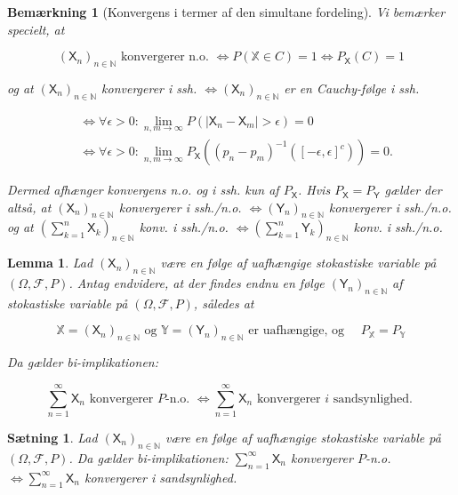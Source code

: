 \documentclass{article}
\newcommand{\1}{\mathbbm{1}}
\newcommand{\X}{\mathsf{X}}
\newcommand{\Y}{\mathsf{Y}}
\theoremstyle{boxed}
\newtheorem{lemma}[theorem]{Lemma}
\newtheorem{remark}[theorem]{Bemærkning}
\newtheorem{proposition}[theorem]{Sætning}
\begin{document}
\begin{remark}[Konvergens i termer af den simultane fordeling] 
    Vi bemærker specielt, at

$$
\left(\X_n\right)_{n \in \mathbb{N}} \text { konvergerer n.o. } \Longleftrightarrow P(\mathbb{X} \in C)=1 \Longleftrightarrow P_{\X}(C)=1
$$

og at
$\left(\X_n\right)_{n \in \mathbb{N}}$ konvergerer i ssh. $\Longleftrightarrow\left(\X_n\right)_{n \in \mathbb{N}}$ er en Cauchy-følge i ssh.

$$
\begin{aligned}
& \Longleftrightarrow \forall \epsilon>0: \lim _{n, m \rightarrow \infty} P\left(\left|\X_n-\X_m\right|>\epsilon\right)=0 \\
& \Longleftrightarrow \forall \epsilon>0: \lim _{n, m \rightarrow \infty} P_{\X}\left(\left(p_n-p_m\right)^{-1}\left([-\epsilon, \epsilon]^c\right)\right)=0 .
\end{aligned}
$$


Dermed afhænger konvergens n.o. og i ssh. kun af $P_{\X}$.
Hvis $P_{\X}=P_{\Y}$ gælder der altså, at
$\left(\X_n\right)_{n \in \mathbb{N}}$ konvergerer i ssh./n.o. $\Longleftrightarrow\left(\Y_n\right)_{n \in \mathbb{N}}$ konvergerer i ssh./n.o.
og at
$\left(\sum_{k=1}^n \X_k\right)_{n \in \mathbb{N}}$ konv. i ssh./n.o. $\Longleftrightarrow\left(\sum_{k=1}^n \Y_k\right)_{n \in \mathbb{N}}$ konv. i ssh./n.o.
\end{remark}
\begin{theorem-box}
    \begin{lemma}
        Lad $\left(\mathsf{X}_n\right)_{n \in \mathbb{N}}$ være en følge af uafhængige stokastiske variable på $(\Omega, \mathcal{F}, P)$.
Antag endvidere, at der findes endnu en følge $\left(\mathsf{Y}_n\right)_{n \in \mathbb{N}}$ af stokastiske variable på $(\Omega, \mathcal{F}, P)$, således at

$$
\mathbb{X}=\left(\mathsf{X}_n\right)_{n \in \mathbb{N}} \text { og } \mathbb{Y}=\left(\mathsf{Y}_n\right)_{n \in \mathbb{N}} \text { er uafhængige, og } \quad P_{\mathbb{X}}=P_{\mathbb{Y}}
$$


Da gælder bi-implikationen:

$$
\sum_{n=1}^{\infty} \mathsf{X}_n \text { konvergerer } P \text {-n.o. } \Longleftrightarrow \sum_{n=1}^{\infty} \mathsf{X}_n \text { konvergerer } i \text { sandsynlighed. }
$$

    \end{lemma}
\end{theorem-box}
\begin{theorem-box}
    \begin{proposition}
        Lad $\left(\mathsf{X}_n\right)_{n \in \mathbb{N}}$ være en følge af uafhængige stokastiske variable på $(\Omega, \mathcal{F}, P)$.
Da gælder bi-implikationen:
$\sum_{n=1}^{\infty} \mathsf{X}_n$ konvergerer $P$-n.o. $\Longleftrightarrow \sum_{n=1}^{\infty} \mathsf{X}_n$ konvergerer i sandsynlighed.
    \end{proposition}
\end{theorem-box}
\end{document}
